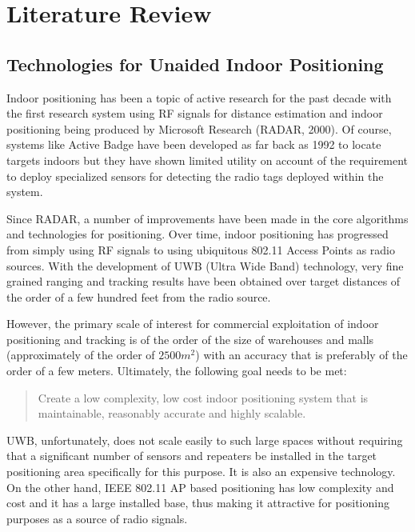 \chapter{Literature Review\label{chap:literature_review}}

\section{Technologies for Unaided Indoor Positioning}
Indoor positioning has been a topic of active research for the past decade with
the first research system using RF signals for distance estimation and indoor
positioning being produced by Microsoft Research (RADAR, 2000)\cite{RADAR}. Of
course, systems like Active Badge\cite{ActiveBadge} have been developed as far
back as 1992 to locate targets indoors but they have shown limited utility on
account of the requirement to deploy specialized sensors for detecting the radio
tags deployed within the system.

Since RADAR, a number of improvements have been made in the core algorithms and
technologies for positioning. Over time, indoor positioning has progressed from
simply using RF signals to using ubiquitous 802.11 Access Points as radio
sources. With the development of UWB (Ultra Wide Band) technology, very fine
grained ranging and tracking results have been obtained over target distances of
the order of a few hundred feet from the radio source.\cite{UWBRanging} 

However, the primary scale of interest for commercial exploitation of indoor
positioning and tracking is of the order of the size of warehouses and malls
(approximately of the order of $2500 m^2$) with an accuracy that is preferably
of the order of a few meters. Ultimately, the following goal needs to be met:

\begin{quote}
Create a low complexity, low cost indoor positioning system that is
maintainable, reasonably accurate and highly scalable.
\end{quote}

UWB, unfortunately, does not scale easily to such large spaces without requiring
that a significant number of sensors and repeaters be installed in the target
positioning area specifically for this purpose. It is also an expensive
technology. On the other hand, IEEE 802.11 AP based positioning has low
complexity and cost and it has a large installed base, thus making it attractive
for positioning purposes as a source of radio signals. 

